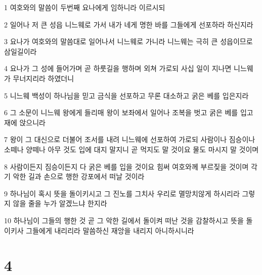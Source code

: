 \par 1 여호와의 말씀이 두번째 요나에게 임하니라 이르시되
\par 2 일어나 저 큰 성읍 니느웨로 가서 내가 네게 명한 바를 그들에게 선포하라 하신지라
\par 3 요나가 여호와의 말씀대로 일어나서 니느웨로 가니라 니느웨는 극히 큰 성읍이므로 삼일길이라
\par 4 요나가 그 성에 들어가며 곧 하룻길을 행하며 외쳐 가로되 사십 일이 지나면 니느웨가 무너지리라 하였더니
\par 5 니느웨 백성이 하나님을 믿고 금식을 선포하고 무론 대소하고 굵은 베를 입은지라
\par 6 그 소문이 니느웨 왕에게 들리매 왕이 보좌에서 일어나 조복을 벗고 굵은 베를 입고 재에 앉으니라
\par 7 왕이 그 대신으로 더불어 조서를 내려 니느웨에 선포하여 가로되 사람이나 짐승이나 소떼나 양떼나 아무 것도 입에 대지 말지니 곧 먹지도 말 것이요 물도 마시지 말 것이며
\par 8 사람이든지 짐승이든지 다 굵은 베를 입을 것이요 힘써 여호와께 부르짖을 것이며 각기 악한 길과 손으로 행한 강포에서 떠날 것이라
\par 9 하나님이 혹시 뜻을 돌이키시고 그 진노를 그치사 우리로 멸망치않게 하시리라 그렇지 않을 줄을 누가 알겠느냐 한지라
\par 10 하나님이 그들의 행한 것 곧 그 악한 길에서 돌이켜 떠난 것을 감찰하시고 뜻을 돌이키사 그들에게 내리리라 말씀하신 재앙을 내리지 아니하시니라

\chapter{4}

